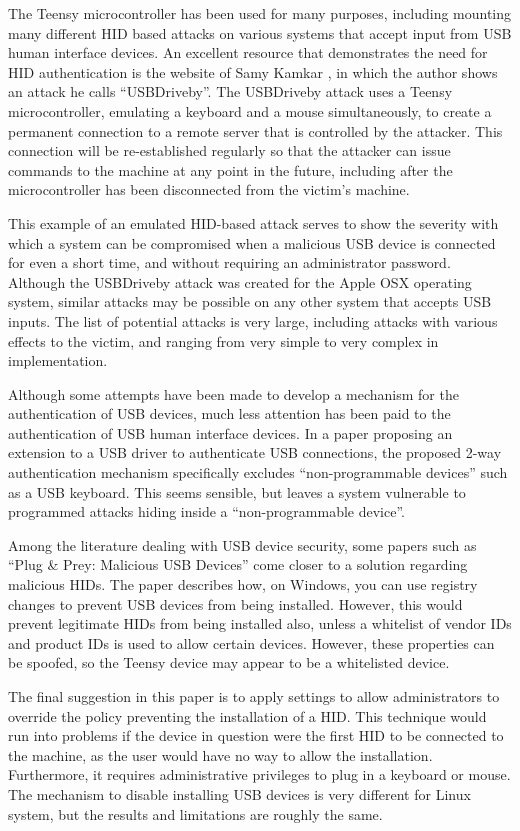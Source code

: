 \documentclass[pagenumbers]{ieee}
\begin{document}
The Teensy microcontroller has been used for many purposes, including mounting many different HID based attacks on various systems that accept input from USB human interface devices. An excellent resource that demonstrates the need for HID authentication is the website of Samy Kamkar \cite{samy}, in which the author shows an attack he calls ``USBDriveby''. The USBDriveby attack uses a Teensy microcontroller, emulating a keyboard and a mouse simultaneously,  to create a permanent connection to a remote server that is controlled by the attacker.  This connection will be re-established regularly so that the attacker can issue commands to the machine at any point in the future, including after the microcontroller has been disconnected from the victim's machine.

This example of an emulated HID-based attack serves to show the severity with which a system can be compromised when a malicious USB device is connected for even a short time, and without requiring an administrator password. Although the USBDriveby attack was created for the Apple OSX operating system, similar attacks may be possible on any other system that accepts USB inputs. The list of potential attacks is very large, including attacks with various effects to the victim, and ranging from very simple to very complex in implementation.

Although some attempts have been made to develop a mechanism for the authentication of USB devices, much less attention has been paid to the authentication of USB human interface devices. In a paper \cite{wang} proposing an extension to a USB driver to authenticate USB connections, the proposed 2-way authentication mechanism specifically excludes ``non-programmable devices'' such as a USB keyboard. This seems sensible, but leaves a system vulnerable to programmed attacks hiding inside a ``non-programmable device''.

Among the literature dealing with USB device security, some papers such as ``Plug \& Prey: Malicious USB Devices'' come closer to a solution regarding malicious HIDs. The paper describes how, on Windows, you can use registry changes to prevent USB devices from being installed. However, this would prevent legitimate HIDs from being installed also, unless a whitelist of vendor IDs and product IDs is used to allow certain devices. However, these properties can be spoofed, so the Teensy device may appear to be a whitelisted device.

The final suggestion in this paper is to apply settings to allow administrators to override the policy preventing the installation of a HID. This technique would run into problems if the device in question were the first HID to be connected to the machine, as the user would have no way to allow the installation. Furthermore, it requires administrative privileges to plug in a keyboard or mouse. The mechanism to disable installing USB devices is very different for Linux system, but the results and limitations are roughly the same.
\end{document}
